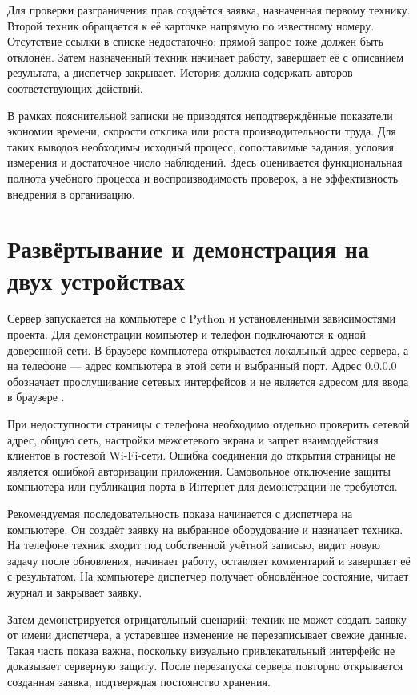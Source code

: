 \documentclass{timcw}
\begin{document}
Для проверки разграничения прав создаётся заявка, назначенная первому технику. Второй техник обращается к её карточке напрямую по известному номеру. Отсутствие ссылки в списке недостаточно: прямой запрос тоже должен быть отклонён. Затем назначенный техник начинает работу, завершает её с описанием результата, а диспетчер закрывает. История должна содержать авторов соответствующих действий.

В рамках пояснительной записки не приводятся неподтверждённые показатели экономии времени, скорости отклика или роста производительности труда. Для таких выводов необходимы исходный процесс, сопоставимые задания, условия измерения и достаточное число наблюдений. Здесь оценивается функциональная полнота учебного процесса и воспроизводимость проверок, а не эффективность внедрения в организацию.

\section{Развёртывание и демонстрация на двух устройствах}

Сервер запускается на компьютере с Python и установленными зависимостями проекта. Для демонстрации компьютер и телефон подключаются к одной доверенной сети. В браузере компьютера открывается локальный адрес сервера, а на телефоне — адрес компьютера в этой сети и выбранный порт. Адрес 0.0.0.0 обозначает прослушивание сетевых интерфейсов и не является адресом для ввода в браузере \cite{src3}.

При недоступности страницы с телефона необходимо отдельно проверить сетевой адрес, общую сеть, настройки межсетевого экрана и запрет взаимодействия клиентов в гостевой Wi-Fi-сети. Ошибка соединения до открытия страницы не является ошибкой авторизации приложения. Самовольное отключение защиты компьютера или публикация порта в Интернет для демонстрации не требуются.

Рекомендуемая последовательность показа начинается с диспетчера на компьютере. Он создаёт заявку на выбранное оборудование и назначает техника. На телефоне техник входит под собственной учётной записью, видит новую задачу после обновления, начинает работу, оставляет комментарий и завершает её с результатом. На компьютере диспетчер получает обновлённое состояние, читает журнал и закрывает заявку.

Затем демонстрируется отрицательный сценарий: техник не может создать заявку от имени диспетчера, а устаревшее изменение не перезаписывает свежие данные. Такая часть показа важна, поскольку визуально привлекательный интерфейс не доказывает серверную защиту. После перезапуска сервера повторно открывается созданная заявка, подтверждая постоянство хранения.
\end{document}
